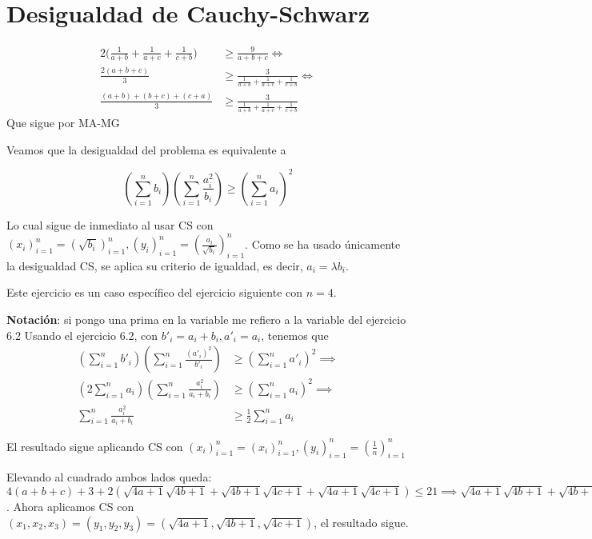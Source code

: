 \section{Desigualdad de Cauchy-Schwarz}

\begin{sol}
	\begin{align}
	2\bigg(\frac{1}{a+b}+\frac{1}{a+c}+\frac{1}{c+b}\bigg) &\geq \frac{9}{a+b+c} \iff \\
	\frac{2(a+b+c)}{3} &\geq \frac{3}{\frac{1}{a+b}+\frac{1}{a+c}+\frac{1}{c+b}} \iff \\
	\frac{(a+b)+(b+c)+(c+a)}{3} &\geq \frac{3}{\frac{1}{a+b}+\frac{1}{a+c}+\frac{1}{c+b}}
	\end{align}
	Que sigue por MA-MG
\end{sol}

\begin{sol}
	Veamos que la desigualdad del problema es equivalente a
	\begin{center}
		$$ (\sum_{i=1}^{n} b_{i})(\sum_{i=1}^{n} \frac{a_{i}^{2}}{b_{i}})\geq (\sum_{i=1}^{n} a_{i})^{2} $$
	\end{center}
	
	Lo cual sigue de inmediato al usar CS con $(x_{i})_{i=1}^{n} = (\sqrt{b_{i}})_{i=1}^{n}, (y_{i})_{i=1}^{n} = (\frac{a_{i}}{\sqrt{b_{i}}})_{i=1}^{n}$. Como se ha usado \'unicamente la desigualdad CS, se aplica su criterio de igualdad, es decir, $a_{i} = \lambda b_{i}$.
\end{sol}

\begin{sol}
	Este ejercicio es un caso espec\'ifico del ejercicio siguiente con $n =4$.
\end{sol}

\begin{sol}
	\textbf{Notaci\'on}: si pongo una prima en la variable me refiero a la variable del ejercicio 6.2
	Usando el ejercicio 6.2, con $b'_{i} = a_{i} +b_{i}, a'_{i} = a_{i}$, tenemos que
	\begin{align}
		 (\sum_{i=1}^{n} b'_{i})(\sum_{i=1}^{n} \frac{(a'_{i})^{2}}{b'_{i}})&\geq (\sum_{i=1}^{n} a'_{i})^{2}  \implies \\		 
		 (2\sum_{i=1}^{n} a_{i})(\sum_{i=1}^{n} \frac{a_{i}^{2}}{a_{i} + b_{i}})&\geq (\sum_{i=1}^{n} a_{i})^{2} \implies \\
		 \sum_{i=1}^{n} \frac{a_{i}^{2}}{a_{i} + b_{i}} &\geq \frac{1}{2}\sum_{i=1}^{n} a_{i}
	\end{align}
\end{sol}

\begin{sol}
	El resultado sigue aplicando CS con $(x_{i})_{i=1}^{n} = (x_{i})_{i=1}^{n}, (y_{i})_{i=1}^{n} = (\frac{1}{n})_{i=1}^{n}$
\end{sol}

\begin{sol}
	Elevando al cuadrado ambos lados queda: $4(a+b+c) + 3 + 2(\sqrt{4a+1}\sqrt{4b+1}+\sqrt{4b+1}\sqrt{4c+1}+\sqrt{4a+1}\sqrt{4c+1}) \leq 21 \implies \sqrt{4a+1}\sqrt{4b+1}+\sqrt{4b+1}\sqrt{4c+1}+\sqrt{4a+1}\sqrt{4c+1} \leq 7$. Ahora aplicamos CS con $(x_{1}, x_{2}, x_{3}) = (y_{1}, y_{2}, y_{3}) = (\sqrt{4a+1}, \sqrt{4b+1}, \sqrt{4c+1})$, el resultado sigue.
\end{sol}